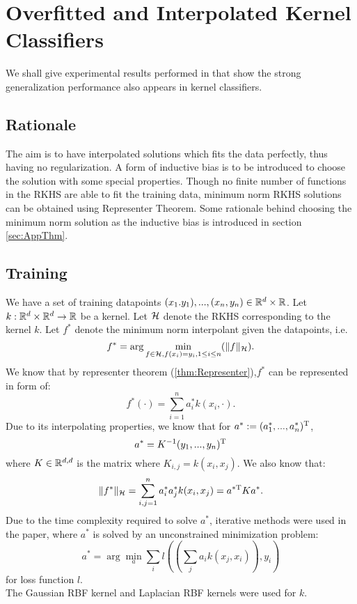 \documentclass[twoside]{memoir}
\begin{document}
\chapter{Overfitted and Interpolated Kernel Classifiers}
We shall give experimental results performed in \cite{UnderstandKernel} that show the strong generalization performance also appears in kernel classifiers.
\section{Rationale}
The aim is to have interpolated solutions which fits the data perfectly, thus having no regularization. A form of inductive bias is to be introduced to choose the solution with some special properties. Though no finite number of functions in the RKHS are able to fit the training data, minimum norm RKHS solutions can be obtained using Representer Theorem. Some rationale behind choosing the minimum norm solution as the inductive bias is introduced in section \ref{sec:AppThm}.
\section{Training}
We have a set of training datapoints $(x_1. y_1), ..., (x_n, y_n) \in \mathbb{R}^d \times \mathbb{R}$.
Let $k: \mathbb{R}^d \times \mathbb{R}^d \rightarrow \mathbb{R}$ be a kernel. Let $\mathcal{H}$ denote the RKHS corresponding to the kernel $k$. Let $f^*$ denote the minimum norm interpolant given the datapoints, i.e.
\begin{equation*}
f^* = \arg \min_{f \in \mathcal{H}, f(x_i) = y_i, 1 \leq i \leq n} (\lVert f\rVert_{\mathcal{H}}).
\end{equation*}
We know that by representer theorem (\ref{thm:Representer}),$f^*$ can be represented in form of:
\[ f^*(\cdot) = \sum_{i=1}^{n} a^*_i k(x_i, \cdot). \]
Due to its interpolating properties, we know that for $a^* := (a^*_1, ..., a^*_n)^{\text{T}}$,
\begin{equation} \label{eqn:interpolation_solution}
a^* = K^{-1} (y_1, ..., y_n)^{\text{T}}
\end{equation}
where $K \in \mathbb{R}^{d,d}$ is the matrix where $K_{i,j} = k(x_i, x_j)$.
We also know that:
\[ \lVert f^*\rVert_{\mathcal{H}} = \sum_{i,j=1}^{n} a^*_i a^*_j k(x_i, x_j) = a^{*\text{T}} K a^*. \]
Due to the time complexity required to solve $a^*$, iterative methods were used in the paper, where $a^*$ is solved by an unconstrained minimization problem:
\begin{equation*}
a^* = \arg \min_{a} \sum_{i} l((\sum_{j}a_i k(x_j,x_i)) , y_i)
\end{equation*}
for loss function $l$.\\
The Gaussian RBF kernel and Laplacian RBF kernels were used for $k$.
\end{document}

